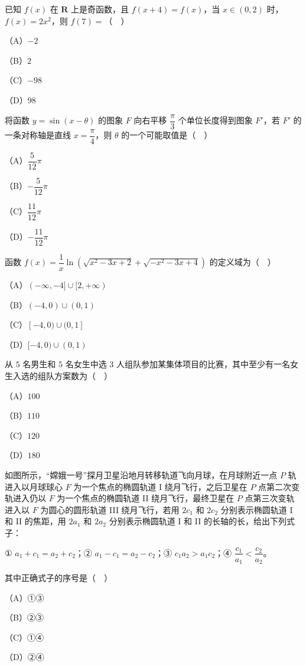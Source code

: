 \begin{question}
已知 $f(x)$ 在 $\mathbf R$ 上是奇函数，且 $f(x+4)=f(x)$，当 $x\in(0,2)$ 时，$f(x)=2x^2$，则 $f(7)=$（　）

（A）$-2$

（B）$2$

（C）$-98$

（D）$98$

\end{question}
\begin{question}
将函数 $y=\sin(x-\theta)$ 的图象 $F$ 向右平移 $\dfrac{\pi}3$ 个单位长度得到图象 $F'$，若 $F'$ 的一条对称轴是直线 $x=\dfrac{\pi}4$，则 $\theta$ 的一个可能取值是（　）

（A）$\dfrac5{12}\pi$

（B）$-\dfrac5{12}\pi$

（C）$\dfrac{11}{12}\pi$

（D）$-\dfrac{11}{12}\pi$

\end{question}
\begin{question}
函数 $f(x)=\dfrac1x\ln\left(\sqrt{x^2-3x+2}+\sqrt{-x^2-3x+4}\right)$ 的定义域为（　）

（A）$(-\infty,-4]\cup[2,+\infty)$

（B）$(-4,0)\cup(0,1)$

（C）$[-4,0)\cup(0,1]$

（D）$[-4,0)\cup(0,1)$

\end{question}
\begin{question}
从 $5$ 名男生和 $5$ 名女生中选 $3$ 人组队参加某集体项目的比赛，其中至少有一名女生入选的组队方案数为（　）

（A）$100$

（B）$110$

（C）$120$

（D）$180$

\Needspace{0.4\textheight}
\end{question}
\begin{question}
如图所示，“嫦娥一号”探月卫星沿地月转移轨道飞向月球，在月球附近一点 $P$ 轨进入以月球球心 $F$ 为一个焦点的椭圆轨道 I 绕月飞行，之后卫星在 $P$ 点第二次变轨进入仍以 $F$ 为一个焦点的椭圆轨道 II 绕月飞行，最终卫星在 $P$ 点第三次变轨进入以 $F$ 为圆心的圆形轨道 III 绕月飞行，若用 $2c_1$ 和 $2c_2$ 分别表示椭圆轨道 I 和 II 的焦距，用 $2a_1$ 和 $2a_2$ 分别表示椭圆轨道 I 和 II 的长轴的长，给出下列式子：

① $a_1+c_1=a_2+c_2$；② $a_1-c_1=a_2-c_2$；③ $c_1a_2>a_1c_2$；④ $\dfrac{c_1}{a_1}<\dfrac{c_2}{a_2}$。

其中正确式子的序号是（　）
\nopagebreak[4]
\begin{center}\end{center}
\nopagebreak[4]
（A）①③

（B）②③

（C）①④

（D）②④

\end{question}

